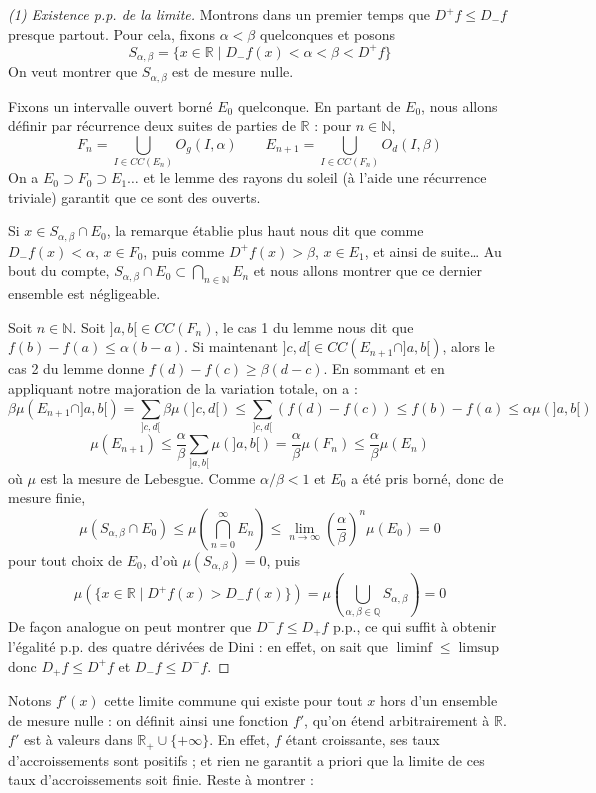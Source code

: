 \documentclass[a4paper, 11pt]{article}
\def\N{\mathbb{N}}
\def\Q{\mathbb{Q}}
\def\R{\mathbb{R}}
\begin{document}
\begin{proof}[(1) Existence p.p. de la limite]
Montrons dans un premier temps que $D^+f \leq D_-f$ presque partout. Pour cela,
fixons $\alpha < \beta$ quelconques et posons
\[ S_{\alpha,\beta} = \{ x \in \R \mid D_-f(x) < \alpha < \beta < D^+f \} \]
On veut montrer que $S_{\alpha,\beta}$ est de mesure nulle.

Fixons un intervalle ouvert borné $E_0$ quelconque.
En partant de $E_0$, nous allons définir par récurrence deux suites de parties
de $\R$ : pour $n \in \N$,
\[ F_n = \bigcup_{I \in CC(E_n)} O_g(I, \alpha) \qquad
   E_{n+1} = \bigcup_{I \in CC(F_n)} O_d(I, \beta) \]
On a $E_0 \supset F_0 \supset E_1 \ldots$ et le lemme des rayons du soleil (à
l'aide une récurrence triviale) garantit que ce sont des ouverts. 

Si $x \in S_{\alpha,\beta} \cap E_0$, la remarque établie plus haut nous dit
que comme $D_-f(x) < \alpha$, $x \in F_0$, puis comme $D^+f(x) > \beta$, $x \in
E_1$, et ainsi de suite… Au bout du compte, $S_{\alpha,\beta} \cap E_0 \subset
\bigcap_{n \in \N} E_n$ et nous allons montrer que ce dernier ensemble est
négligeable.

Soit $n \in \N$. Soit $]a,b[ \in CC(F_n)$, le cas 1 du lemme nous dit que
$f(b) - f(a) \leq \alpha(b-a)$. Si maintenant $]c,d[ \in CC(E_{n+1} \cap
]a,b[)$, alors le cas 2 du lemme donne $f(d)-f(c) \geq \beta(d-c)$. En sommant
et en appliquant notre majoration de la variation totale, on a :
\[ \beta\mu(E_{n+1} \cap ]a,b[) = \sum_{]c,d[} \beta\mu(]c,d[) \leq \sum_{]c,d[}
  (f(d) - f(c)) \leq f(b) - f(a) \leq \alpha\mu(]a,b[) \]
\[ \mu(E_{n+1}) \leq \frac{\alpha}{\beta} \sum_{]a,b[} \mu(]a,b[) =
  \frac{\alpha}{\beta} \mu(F_n) \leq \frac{\alpha}{\beta} \mu(E_n) \] où $\mu$
est la mesure de Lebesgue. Comme $\alpha/\beta < 1$ et $E_0$ a été pris borné,
donc de mesure finie,
\[ \mu(S_{\alpha,\beta} \cap E_0) \leq \mu \left( \bigcap_{n=0}^\infty E_n \right)
  \leq \lim_{n \to \infty} \left( \frac{\alpha}{\beta} \right)^n \mu(E_0) = 0 \]
pour tout choix de $E_0$, d'où $\mu(S_{\alpha,\beta}) = 0$, puis
\[ \mu\left( \{x \in \R \mid  D^+f(x) > D_-f(x) \} \right)
  = \mu\left( \bigcup_{\alpha, \beta \in \Q} S_{\alpha,\beta} \right)
  = 0 \]
De façon analogue on peut montrer que $D^-f \leq D_+f$ p.p., ce qui suffit à
obtenir l'égalité p.p. des quatre dérivées de Dini : en effet, on sait que
$\liminf \leq \limsup$ donc $D_+f \leq D^+f$ et $D_-f \leq D^-f$.
\end{proof}

Notons $f'(x)$ cette limite commune qui existe pour tout $x$ hors d'un ensemble
de mesure nulle : on définit ainsi une fonction $f'$, qu'on étend arbitrairement
à $\R$. $f'$ est à valeurs dans $\R_+ \cup \{+\infty\}$. En effet, $f$ étant
croissante, ses taux d'accroissements sont positifs ; et rien ne garantit a
priori que la limite de ces taux d'accroissements soit finie. Reste à montrer :
\end{document}
